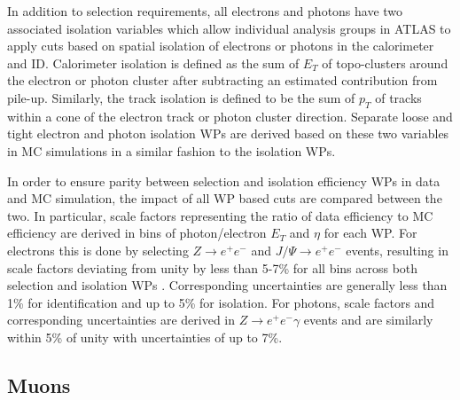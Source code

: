 In addition to selection requirements, all electrons and photons have two associated isolation variables which allow 
individual analysis groups in ATLAS to apply cuts based on spatial isolation of electrons or photons in the calorimeter 
and ID. Calorimeter isolation is defined as the sum of $E_T$ of topo-clusters around the electron or photon cluster 
after subtracting an estimated contribution from pile-up. Similarly, the track isolation is defined to be the sum of 
$p_T$ of tracks within a cone of the electron track or photon cluster direction. Separate loose and tight electron and 
photon isolation WPs are derived based on these two variables in MC simulations in a similar fashion to the isolation 
WPs. \par

In order to ensure parity between selection and isolation efficiency WPs in data and MC simulation, the impact of all WP 
based cuts are compared between the two. In particular, scale factors representing the ratio of data efficiency to MC 
efficiency are derived in bins of photon/electron $E_T$ and $\eta$ for each WP. For electrons this is done by selecting 
$Z \rightarrow e^+e^-$ and $J/\Psi \rightarrow e^+e^-$ events, resulting in scale factors deviating from unity by less 
than 5-7\% for all bins across both selection and isolation WPs \cite{atlas-electrons-photons-eff}. Corresponding 
uncertainties are generally less than 1\% for identification and up to 5\% for isolation. For photons, scale factors and 
corresponding uncertainties are derived in $Z \rightarrow e^+e^-\gamma$ events and are similarly within 5\% of unity with 
uncertainties of up to 7\%. \par

\subsection{Muons}

